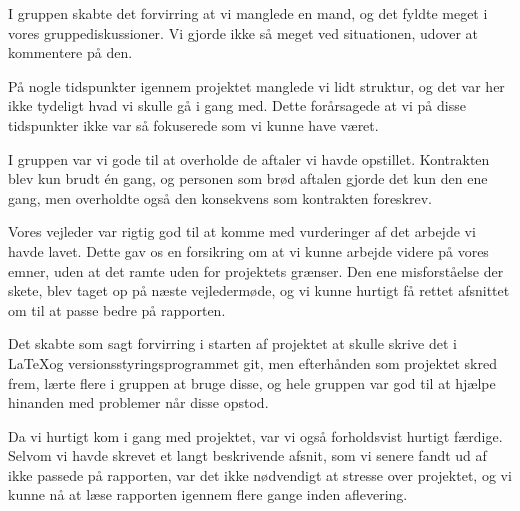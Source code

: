 I gruppen skabte det forvirring at vi manglede en mand, og det fyldte meget i vores gruppediskussioner. Vi gjorde ikke så meget ved situationen, udover at kommentere på den.

På nogle tidspunkter igennem projektet manglede vi lidt struktur, og det var her ikke tydeligt hvad vi skulle gå i gang med. Dette forårsagede at vi på disse tidspunkter ikke var så fokuserede som vi kunne have været.

I gruppen var vi gode til at overholde de aftaler vi havde opstillet. Kontrakten blev kun brudt \'en gang, og personen som brød aftalen gjorde det kun den ene gang, men overholdte også den konsekvens som kontrakten foreskrev. 

Vores vejleder var rigtig god til at komme med vurderinger af det arbejde vi havde lavet. Dette gav os en forsikring om at vi kunne arbejde videre på vores emner, uden at det ramte uden for projektets grænser. Den ene misforståelse der skete, blev taget op på næste vejledermøde, og vi kunne hurtigt få rettet afsnittet om til at passe bedre på rapporten.

Det skabte som sagt forvirring i starten af projektet at skulle skrive det i \LaTeX og versionsstyringsprogrammet git, men efterhånden som projektet skred frem, lærte flere i gruppen at bruge disse, og hele gruppen var god til at hjælpe hinanden med problemer når disse opstod.

Da vi hurtigt kom i gang med projektet, var vi også forholdsvist hurtigt færdige. Selvom vi havde skrevet et langt beskrivende afsnit, som vi senere fandt ud af ikke passede på rapporten, var det ikke nødvendigt at stresse over projektet, og vi kunne nå at læse rapporten igennem flere gange inden aflevering. 